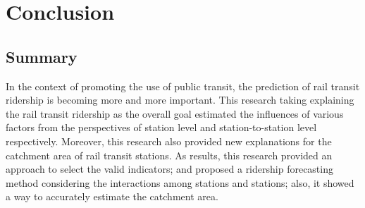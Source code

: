 \chapter{Conclusion}
%
\section{Summary}
In the context of promoting the use of public transit, the prediction of rail transit ridership is becoming more and more important. This research taking explaining the rail transit ridership as the overall goal estimated the influences of various factors from the perspectives of station level and station-to-station level respectively. Moreover, this research also provided new explanations for the catchment area of rail transit stations. As results, this research provided an approach to select the valid indicators; and proposed a ridership forecasting method considering the interactions among stations and stations; also, it showed a way to accurately estimate the catchment area.


